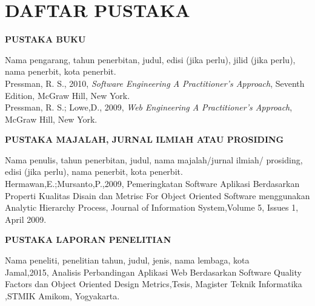 \documentclass[oneside,listof=totoc]{scrbook}
\begin{document}
\chapter{DAFTAR PUSTAKA}

\vspace{0.5cm}

\begin{singlespace}
\noindent\textbf{PUSTAKA BUKU}\\

\begin{hangparas}{25pt}{1}
Nama pengarang, tahun penerbitan, judul, edisi (jika perlu), jilid (jika perlu), nama penerbit, kota penerbit.\\

Pressman, R. S., 2010, \textit{Software Engineering A Practitioner’s Approach}, Seventh Edition, McGraw Hill, New York.\\

Pressman, R. S.; Lowe,D., 2009, \textit{Web Engineering A Practitioner’s Approach}, McGraw Hill, New York.\\
\end{hangparas}

\vspace{0.5cm}

\noindent\textbf{PUSTAKA MAJALAH, JURNAL ILMIAH ATAU PROSIDING}\\

\begin{hangparas}{25pt}{1}
Nama penulis, tahun penerbitan, judul, nama majalah/jurnal ilmiah/ prosiding, edisi (jika perlu), nama penerbit, kota penerbit.\\

Hermawan,E.;Mursanto,P.,2009, Pemeringkatan Software Aplikasi Berdasarkan Properti Kualitas Disain dan Metrisc For Object Oriented Software menggunakan Analytic Hierarchy Process, Journal of Information System,Volume 5, Issues 1, April 2009.\\
\end{hangparas}

\vspace{0.5cm}

\noindent\textbf{PUSTAKA LAPORAN PENELITIAN}\\

\begin{hangparas}{25pt}{1}
Nama peneliti, penelitian tahun, judul, jenis, nama lembaga, kota\\

Jamal,2015, Analisis Perbandingan Aplikasi Web Berdasarkan Software Quality Factors dan Object Oriented Design Metrics,Tesis, Magister Teknik Informatika ,STMIK Amikom, Yogyakarta.\\
\end{hangparas}
\vspace{0.5cm}


\end{singlespace}
\end{document}
